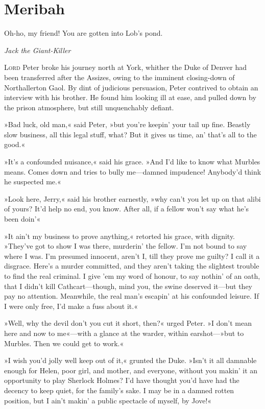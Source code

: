 
\chapter{Meribah}

\epigraph{Oh-ho, my friend! You are gotten into Lob's pond.}{\textit{Jack the Giant-Killer}}


\lettrine[lines=4]{L}{ord} Peter broke his journey north at York, whither the Duke of Denver had been transferred after the Assizes, owing to the imminent closing-down of Northallerton Gaol. By dint of judicious persuasion, Peter contrived to obtain an interview with his brother. He found him looking ill at ease, and pulled down by the prison atmosphere, but still unquenchably defiant.

»Bad luck, old man,« said Peter, »but you're keepin' your tail up fine. Beastly slow business, all this legal stuff, what? But it gives us time, an' that's all to the good.«

»It's a confounded nuisance,« said his grace. »And I'd like to know what Murbles means. Comes down and tries to bully me—damned impudence! Anybody'd think he suspected me.«

»Look here, Jerry,« said his brother earnestly, »why can't you let up on that alibi of yours? It'd help no end, you know. After all, if a fellow won't say what he's been doin'\longdash«

»It ain't my business to prove anything,« retorted his grace, with dignity. »They've got to show I was there, murderin' the fellow. I'm not bound to say where I was. I'm presumed innocent, aren't I, till they prove me guilty? I call it a disgrace. Here's a murder committed, and they aren't taking the slightest trouble to find the real criminal. I give 'em my word of honour, to say nothin' of an oath, that I didn't kill Cathcart—though, mind you, the swine deserved it—but they pay no attention. Meanwhile, the real man's escapin' at his confounded leisure. If I were only free, I'd make a fuss about it.«

»Well, why the devil don't you cut it short, then?« urged Peter. »I don't mean here and now to me«—with a glance at the warder, within earshot—»but to Murbles. Then we could get to work.«

»I wish you'd jolly well keep out of it,« grunted the Duke. »Isn't it all damnable enough for Helen, poor girl, and mother, and everyone, without you makin' it an opportunity to play Sherlock Holmes? I'd have thought you'd have had the decency to keep quiet, for the family's sake. I may be in a damned rotten position, but I ain't makin' a public spectacle of myself, by Jove!«

